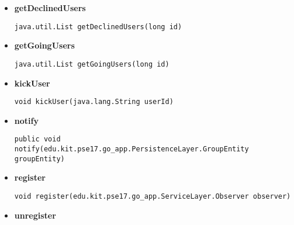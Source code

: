 \documentclass[11pt,a4paper]{report}
\begin{document}
{{{{{{{{{{{{{{{\begin{itemize}
{\begin{lstlisting}[frame=none]
public edu.kit.pse17.go_app.PersistenceLayer.GoEntity getById(java.lang.Long id)\end{lstlisting} %
}%
\item{ 
\hypertarget{edu.kit.pse17.go_app.PersistenceLayer.daos.GroupDaoImp.getDeclinedUsers(long)}{{\bf  getDeclinedUsers}\\}
\begin{lstlisting}[frame=none]
java.util.List getDeclinedUsers(long id)\end{lstlisting} %
}%
\item{ 
\hypertarget{edu.kit.pse17.go_app.PersistenceLayer.daos.GroupDaoImp.getGoingUsers(long)}{{\bf  getGoingUsers}\\}
\begin{lstlisting}[frame=none]
java.util.List getGoingUsers(long id)\end{lstlisting} %
}%
\item{ 
\hypertarget{edu.kit.pse17.go_app.PersistenceLayer.daos.GroupDaoImp.kickUser(java.lang.String)}{{\bf  kickUser}\\}
\begin{lstlisting}[frame=none]
void kickUser(java.lang.String userId)\end{lstlisting} %
}%
\item{ 
\hypertarget{edu.kit.pse17.go_app.PersistenceLayer.daos.GroupDaoImp.notify(edu.kit.pse17.go_app.PersistenceLayer.GroupEntity)}{{\bf  notify}\\}
\begin{lstlisting}[frame=none]
public void notify(edu.kit.pse17.go_app.PersistenceLayer.GroupEntity groupEntity)\end{lstlisting} %
}%
\item{ 
\hypertarget{edu.kit.pse17.go_app.PersistenceLayer.daos.GroupDaoImp.register(edu.kit.pse17.go_app.ServiceLayer.Observer)}{{\bf  register}\\}
\begin{lstlisting}[frame=none]
void register(edu.kit.pse17.go_app.ServiceLayer.Observer observer)\end{lstlisting} %
}%
\item{ 
\hypertarget{edu.kit.pse17.go_app.PersistenceLayer.daos.GroupDaoImp.unregister(edu.kit.pse17.go_app.ServiceLayer.Observer)}{{\bf  unregister}\\}
}
\end{itemize}}}}}}}}}}}}}}}}
\end{document}
